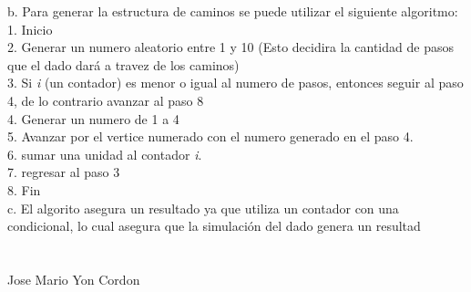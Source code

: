 \documentclass{article}
\begin{document}
b. Para generar la estructura de caminos se puede utilizar el siguiente algoritmo:\\
\hspace*{1cm} 1. Inicio\\ 
\hspace*{1cm} 2. Generar un numero aleatorio entre 1 y 10 (Esto decidira la cantidad de pasos \hspace*{2cm}que el dado dará a travez de los caminos)\\
\hspace*{1cm} 3. Si \emph{i} (un contador) es menor o igual al numero de pasos, entonces seguir al paso \hspace*{2cm}4, de lo contrario avanzar al paso 8\\
\hspace*{1cm} 4. Generar un numero de 1 a 4\\
\hspace*{1cm} 5. Avanzar por el vertice numerado con el numero generado en el paso 4.\\
\hspace*{1cm} 6. sumar una unidad al contador \emph{i}.\\
\hspace*{1cm} 7. regresar al paso 3\\
\hspace*{1cm} 8. Fin\\

c. El algorito asegura un resultado ya que utiliza un contador con una condicional, lo \hspace*{1cm}cual asegura que la simulación del dado genera un resultad\\
\\
\\
\large
Jose Mario Yon Cordon
\end{document}
